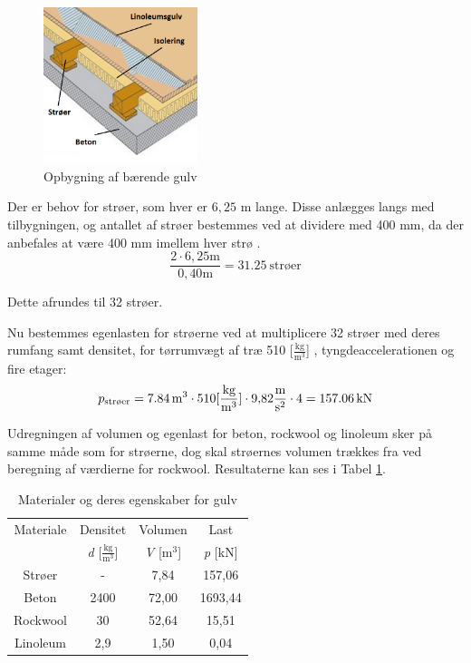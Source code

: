 \begin{figure}[H]
	\centering
	\includegraphics[width=0.4\textwidth]{billeder/gulv.png}
	\caption{Opbygning af bærende gulv \citep{gulv} \citep{granse}}
	\label{fig:gulv}
\end{figure}

Der er behov for strøer, som hver er $6,\!25$ m lange. Disse anlægges langs med tilbygningen, og antallet af strøer bestemmes ved at dividere med 400 mm, da der anbefales at være 400 mm imellem hver strø \citep{Gulvopbygning}. 
\begin{equation}
	\frac{2\cdot 6,\!25 \text{m}}{0,\!40 \text{m}} = \SI{31,25}{\text{strøer}}
\end{equation} 

Dette afrundes til 32 strøer.


Nu bestemmes egenlasten for strøerne ved at multiplicere 32 strøer med deres rumfang samt densitet, for tørrumvægt af træ 510 [$\frac{\text{kg}}{\text{m}^3}$] \citep{torrumvagt}, tyngdeaccelerationen og fire etager:
\begin{equation}
	p_{\textup{strøer}} = \SI{7,84}{m^3} \cdot 510 [\frac{\text{kg}}{\text{m}^3}] \cdot 9,\!82 \frac{\text{m}}{\text{s}^2} \cdot 4 = \SI{157,06}{kN}
\end{equation}

Udregningen af volumen og egenlast for beton, rockwool og linoleum sker på samme måde som for strøerne, dog skal strøernes volumen trækkes fra ved beregning af værdierne for rockwool. Resultaterne kan ses i Tabel \ref{tab:densi}.

\begin{table} [H]
	\begin{center}
		\begin{tabular}{c c c c}
			\hline
			Materiale & Densitet & Volumen & Last \\
			& \textit{d} [$\frac{\text{kg}}{\text{m}^3}$] & \textit{V} [$\text{m}^3$] & \textit{p} [kN] \\ \hline
			Strøer & - & 7,84 & 157,06	\\
			Beton    & 2400 & 72,00 & 1693,44      \\ 
			Rockwool & 30  & 52,64 & 15,51     \\ 
			Linoleum & 2,9 & 1,50 & 0,04 \\ 
		\end{tabular}
		\caption{Materialer og deres egenskaber for gulv}
		\label{tab:densi}
	\end{center}
\end{table}


